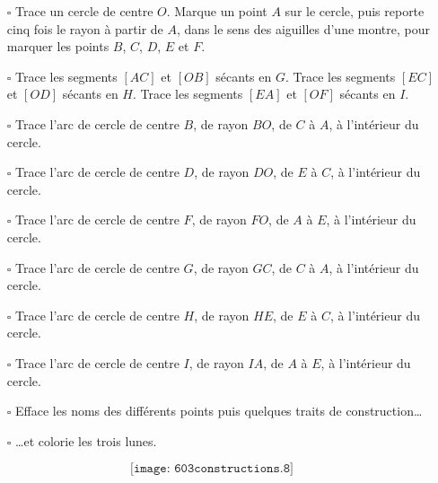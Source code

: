 \begin{cursive}
\begin{itemize}
\item[$\square$] Trace un cercle de centre $O$. Marque un point $A$
sur le cercle, puis reporte cinq fois le rayon à partir de $A$, dans
le sens des aiguilles d'une montre, pour marquer les points $B$, $C$,
$D$, $E$ et $F$.
\item[$\square$] Trace les segments $[AC]$ et $[OB]$ sécants en
$G$. Trace les segments $[EC]$ et $[OD]$ sécants en $H$. Trace les
segments $[EA]$ et $[OF]$ sécants en $I$.
\item[$\square$] Trace l'arc de cercle de centre $B$, de rayon $BO$,
de $C$ à $A$, à l'intérieur du cercle.
\item[$\square$] Trace l'arc de cercle de centre $D$, de rayon $DO$,
de $E$ à $C$, à l'intérieur du cercle.
\item[$\square$] Trace l'arc de cercle de centre $F$, de rayon $FO$,
de $A$ à $E$, à l'intérieur du cercle.
\item[$\square$] Trace l'arc de cercle de centre $G$, de rayon $GC$,
de $C$ à $A$, à l'intérieur du cercle.
\item[$\square$] Trace l'arc de cercle de centre $H$, de rayon $HE$,
de $E$ à $C$, à l'intérieur du cercle.
\item[$\square$] Trace l'arc de cercle de centre $I$, de rayon $IA$,
de $A$ à $E$, à l'intérieur du cercle.
\item[$\square$] Efface les noms des différents points puis quelques
traits de construction\ldots
\item[$\square$] \ldots et colorie les trois lunes.
\end{itemize}
\end{cursive}
\[\texttt{[image: 603constructions.8]}\]
